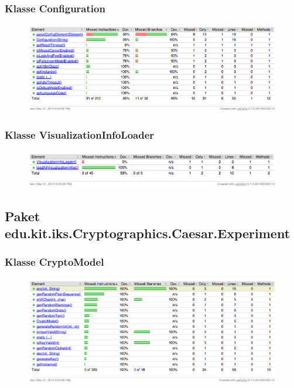 \documentclass{article}
\begin{document}
    \subsubsection{Klasse Configuration}
      \begin{figure}[H]
        \centering
          \includegraphics[width=\textwidth]{resources/coverage_lib_configuration}
      \end{figure}

    \subsubsection{Klasse VisualizationInfoLoader}
      \begin{figure}[H]
        \centering
          \includegraphics[width=\textwidth]{resources/coverage_lib_visualizationinfoloader}
      \end{figure}

  \subsection{Paket edu.kit.iks.Cryptographics.Caesar.Experiment}
    \subsubsection{Klasse CryptoModel}
      \begin{figure}[H]
        \centering
          \includegraphics[width=\textwidth]{resources/coverage_caesar_model}
      \end{figure}
\end{document}
